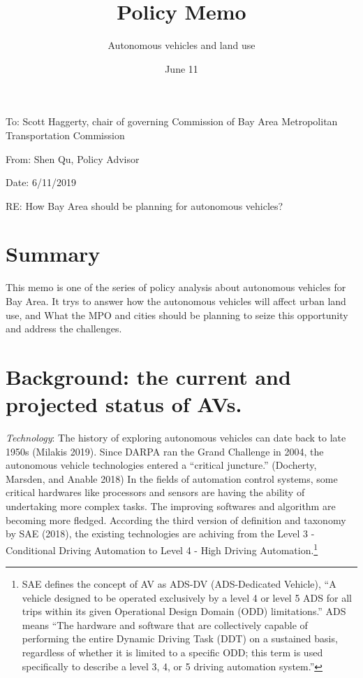 \documentclass[12pt,]{article}
\title{Policy Memo}
\subtitle{Autonomous vehicles and land use}
\author{}
\date{June 11}
\let\rmarkdownfootnote\footnote%
\def\footnote{\protect\rmarkdownfootnote}
\begin{document}
\maketitle

To: Scott Haggerty, chair of governing Commission of Bay Area
Metropolitan Transportation Commission

From: Shen Qu, Policy Advisor

Date: 6/11/2019

RE: How Bay Area should be planning for autonomous vehicles?

\hypertarget{summary}{%
\section{Summary}\label{summary}}

This memo is one of the series of policy analysis about autonomous
vehicles for Bay Area. It trys to answer how the autonomous vehicles
will affect urban land use, and What the MPO and cities should be
planning to seize this opportunity and address the challenges.

\hypertarget{background-the-current-and-projected-status-of-avs.}{%
\section{Background: the current and projected status of
AVs.}\label{background-the-current-and-projected-status-of-avs.}}

\emph{Technology}: The history of exploring autonomous vehicles can date
back to late 1950s (Milakis 2019). Since DARPA ran the Grand Challenge
in 2004, the autonomous vehicle technologies entered a ``critical
juncture.'' (Docherty, Marsden, and Anable 2018) In the fields of
automation control systems, some critical hardwares like processors and
sensors are having the ability of undertaking more complex tasks. The
improving softwares and algorithm are becoming more fledged. According
the third version of definition and taxonomy by SAE (2018), the existing
technologies are achiving from the Level 3 - Conditional Driving
Automation to Level 4 - High Driving Automation.\footnote{SAE defines
  the concept of AV as ADS-DV (ADS-Dedicated Vehicle), ``A vehicle
  designed to be operated exclusively by a level 4 or level 5 ADS for
  all trips within its given Operational Design Domain (ODD)
  limitations.'' ADS means ``The hardware and software that are
  collectively capable of performing the entire Dynamic Driving Task
  (DDT) on a sustained basis, regardless of whether it is limited to a
  specific ODD; this term is used specifically to describe a level 3, 4,
  or 5 driving automation system.''}
\end{document}
